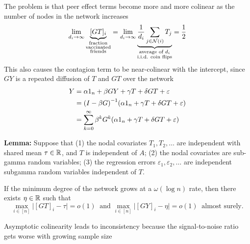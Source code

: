 \documentclass[final]{beamer}
\newlength{\colwidth}
\begin{document}
\begin{frame}[t]
\begin{columns}[t]
\begin{column}{\colwidth}
\begin{block}{The problem is that peer effect terms become more and more colinear as the number of nodes in the network increases}
                \begin{equation} \label{eq:avg}
                    \lim_{d_i \to \infty}
                    \underbrace{[GT]_i}_{\substack{\text{fraction} \\ \text{vaccinated} \\ \text{friends}}}
                    =
                    \lim_{d_i \to \infty}
                    \underbrace{
                        \frac{1}{d_i} \sum_{j \in \mathcal N(i)} T_j
                    }_{\substack{\text{average of $d_i$}           \\ \text{i.i.d. coin flips}}}
                    = \frac 12
                \end{equation}
                This also causes the contagion term to be near-colinear with the intercept, since $GY$ is a repeated diffusion of $T$ and $GT$ over the network
                \begin{align*}
                    Y & = \alpha 1_n + \beta G Y + \gamma T + \delta G T + \varepsilon                            \\
                      & = \paren*{I - \beta G}^{-1} \paren*{\alpha 1_n + \gamma T + \delta G T + \varepsilon}     \\
                      & = \sum_{k=0}^\infty \beta^k G^k \paren*{\alpha 1_n + \gamma T + \delta G T + \varepsilon}
                \end{align*}

                \textbf{Lemma:} Suppose that (1) the nodal covariates $T_1, T_2, \dots$ are independent with shared mean $\tau \in \mathbb{R}$, and $T$ is independent of $A$; (2) the nodal covariates are sub-gamma random variables; (3) the regression errors $\varepsilon_1, \varepsilon_2, \dots$ are independent subgamma random variables independent of $T$.

                If the minimum degree of the network grows at a $\omega(\log n)$ rate, then there exists $\eta \in \mathbb{R}$ such that
                \begin{equation*}
                    \max_{i \in [n]} \Big| [GT]_i - \tau \Big|
                    = o(1) ~ \text{ and }
                    \max_{i \in [n]} \Big| [GY]_i - \eta \Big| = o(1)~ \text{ almost surely.}
                \end{equation*}
            \end{block}

            \begin{block}{Asymptotic colinearity leads to inconsistency because the signal-to-noise ratio gets worse with growing sample size}


\end{block}
\end{column}
\end{columns}
\end{frame}
\end{document}
